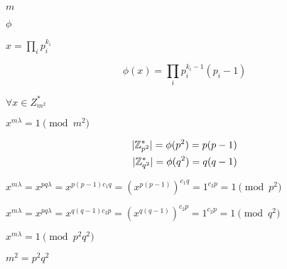 \documentclass[10pt]{book}
\begin{document}
\begin{mdSnippets}
\begin{mdInlineSnippet}[6f8f57715090da2632453988d9a1501b]
$m$\end{mdInlineSnippet}%
\begin{mdInlineSnippet}[1ed346930917426bc46d41e22cc525ec]%
$\phi$\end{mdInlineSnippet}%
\begin{mdInlineSnippet}[a1edac4562c455980b6b8f3ee538ad53]%
$x = \prod_i p_i^{k_i}$\end{mdInlineSnippet}%
\begin{mdDisplaySnippet}[e6d7b1938c0814800fb1f185acafefab]%
\[%
\phi(x) = \prod_{i} p_i^{k_i - 1}(p_i - 1)
\]%
\end{mdDisplaySnippet}%
\begin{mdInlineSnippet}[522c6d444568b8f9539c1f066ae5b008]%
$\forall x \in Z_{m^2}^*$\end{mdInlineSnippet}%
\begin{mdInlineSnippet}[01bdcdec3ab27518fe97d882b19920f8]%
$x^{m\lambda} = 1 \pmod {m^2}$\end{mdInlineSnippet}%
\begin{mdDisplaySnippet}%
\[%
\begin{aligned}
   |\Z_{p^2}^*| = \phi(p^2) = p(p-1) \\
   |\Z_{q^2}^*| = \phi(q^2) = q(q-1)
\end{aligned}
\]%
\end{mdDisplaySnippet}%
\begin{mdInlineSnippet}[2816d46d2cee968b89745329d91913b3]%
$x^{m\lambda} = x^{pq\lambda} = x^{p(p-1)c_1q} = (x^{p(p-1)})^{c_1q} = 1^{c_2p} = 1 \pmod {p^2}$\end{mdInlineSnippet}%
\begin{mdInlineSnippet}[a7a4ea9493603e6e77bf026346f5a8a1]%
$x^{m \lambda} =x^{pq\lambda} = x^{q(q-1)c_2p} = (x^{q(q-1)})^{c_2p} = 1^{c_2p} = 1 \pmod {q^2}$\end{mdInlineSnippet}%
\begin{mdInlineSnippet}[45b11664646acb225ac8f7c9c586a506]%
$x^{m\lambda} = 1 \pmod {p^2q^2}$\end{mdInlineSnippet}%
\begin{mdInlineSnippet}[f9e43442019568f144b4eac480b614e3]%
$m^2 = p^2q^2$\end{mdInlineSnippet}%

\end{mdSnippets}
\end{document}
